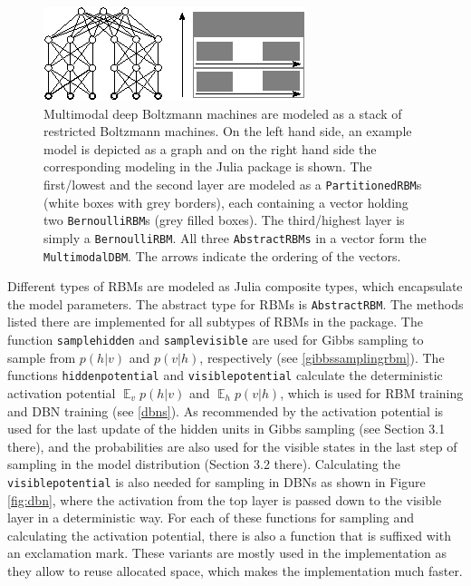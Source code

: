\documentclass[12pt]{article}
\newcommand{\inlinecode}[1]{\texttt{#1}}
\DeclareMathOperator{\EX}{\mathbb{E}}
\begin{document}
\begin{figure}[h]
   \centering
   \includegraphics[scale=3.]{images/MDBMImpl.eps}
   \caption{Multimodal deep Boltzmann machines are modeled as a stack of restricted Boltzmann machines. On the left hand side, an example model is depicted as a graph and on the right hand side the corresponding modeling in the Julia package is shown.
   The first/lowest and the second layer are modeled as a \inlinecode{PartitionedRBM}s (white boxes with grey borders), each containing a vector holding two \inlinecode{BernoulliRBM}s (grey filled boxes).
   The third/highest layer is simply a \inlinecode{BernoulliRBM}.
   All three \inlinecode{AbstractRBMs} in a vector form the \inlinecode{MultimodalDBM}.
   The arrows indicate the ordering of the vectors.}
\label{mdbmimplasstack}
\end{figure}

Different types of RBMs are modeled as Julia composite types, which encapsulate the model parameters.
The abstract type for RBMs is \inlinecode{AbstractRBM}.
The methods listed there are implemented for all subtypes of RBMs in the package.
The function \inlinecode{samplehidden} and \inlinecode{samplevisible} are used for Gibbs sampling to sample from $p(h|v)$ and $p(v|h)$, respectively (see \ref{gibbssamplingrbm}).
The functions \inlinecode{hiddenpotential} and \inlinecode{visiblepotential} calculate the deterministic activation potential $\EX_v p(h|v)$ and $\EX_h p(v|h)$, which is used for RBM training and DBN training (see \ref{dbns}).
As recommended by \cite{hinton_practical_2012} the activation potential is used for the last update of the hidden units in Gibbs sampling (see Section 3.1 there), and the probabilities are also used for the visible states in the last step of sampling in the model distribution (Section 3.2 there).
Calculating the \inlinecode{visiblepotential} is also needed for sampling in DBNs as shown in Figure \ref{fig:dbn}, where the activation from the top layer is passed down to the visible layer in a deterministic way.
For each of these functions for sampling and calculating the activation potential, there is also a function that is suffixed with an exclamation mark.
These variants are mostly used in the implementation as they allow to reuse allocated space, which makes the implementation much faster.
\end{document}
